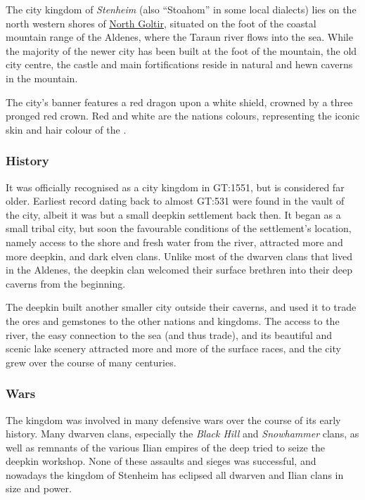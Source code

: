 The city kingdom of \emph{Stenheim} (also ``Stoahom'' in some local dialects)
lies on the north western shores of \hyperref[sec:Goltir]{North Goltir},
situated on the foot of the coastal mountain range of the Aldenes, where the
Taraun river flows into the sea. While the majority of the newer city has been
built at the foot of the mountain, the old city centre, the castle and main
fortifications reside in natural and hewn caverns in the mountain.

The city's banner features a red dragon upon a white shield, crowned by a
three pronged red crown. Red and white are the nations colours, representing
the iconic skin and hair colour of the .

\subsubsection{History}

It was officially recognised as a city kingdom in GT:1551, but is considered
far older. Earliest record dating back to almost GT:531 were found in the
vault of the city, albeit it was but a small deepkin settlement back then. It
began as a small tribal city, but soon the favourable conditions of the
settlement's location, namely access to the shore and fresh water from the
river, attracted more and more deepkin, and dark elven clans. Unlike most of
the dwarven clans that lived in the Aldenes, the deepkin clan welcomed their
surface brethren into their deep caverns from the beginning.

The deepkin built another smaller city outside their caverns, and used it to
trade the ores and gemstones to the other nations and kingdoms. The access to
the river, the easy connection to the sea (and thus trade), and its beautiful
and scenic lake scenery attracted more and more of the surface races, and the
city grew over the course of many centuries.

\subsubsection{Wars}

The kingdom was involved in many defensive wars over the course of its early
history. Many dwarven clans, especially the \emph{Black Hill} and
\emph{Snowhammer} clans, as well as remnants of the various Ilian empires of
the deep tried to seize the deepkin workshop. None of these assaults and sieges
was successful, and nowadays the kingdom of Stenheim has eclipsed all dwarven
and Ilian clans in size and power.

